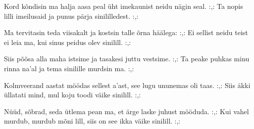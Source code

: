 Kord k\~ondisin ma halja aasa peal
\"uht imekaunist neidu n\"agin seal.
:,: Ta nopis lilli imeilusaid
    ja punus p\"arja sinililledest. :,: 

Ma tervitasin teda viisakalt
ja kostsin talle \~orna h\"a\"alega:
:,: Ei sellist neidu teist ei leia ma,
    kui sinus peidus olev sinilill. :,: 

Siis p\~o\~osa alla maha istsime
ja tasakesi juttu vestsime.
:,: Ta peake puhkas minu rinna na'al
    ja tema sinilille murdsin ma. :,: 

Kolmveerand aastat m\"o\"odas sellest a'ast,
see lugu ununemas oli taas.
:,: Siis \"akki \"ullatati mind,
    mul koju toodi v\"aike sinilill. :,: 

N\"u\"ud, s\~obrad, seda \"utlema pean ma,
et \"arge laske juhust m\"o\"oduda.
:,: Kui vahel murdub, murdub m\~oni lill,
    siis on see ikka v\"aike sinilill. :,: 